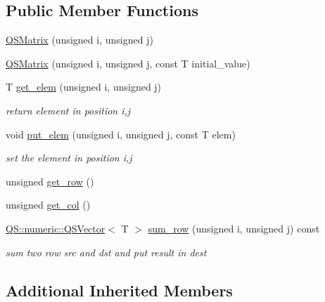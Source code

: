 \subsection*{Public Member Functions}
\begin{DoxyCompactItemize}
\item 
\hyperlink{classQS_1_1numeric_1_1QSMatrix_a5961bea3cd4910419a6b2974fd2273aa}{Q\-S\-Matrix} (unsigned i, unsigned j)
\item 
\hyperlink{classQS_1_1numeric_1_1QSMatrix_a59a9e72a3c77a464215ed2d0e1c4a1de}{Q\-S\-Matrix} (unsigned i, unsigned j, const T initial\-\_\-value)
\item 
T \hyperlink{classQS_1_1numeric_1_1QSMatrix_ad733adc478a7511c872a62ec05bf2af7}{get\-\_\-elem} (unsigned i, unsigned j)
\begin{DoxyCompactList}\small\item\em return element in position i,j \end{DoxyCompactList}\item 
void \hyperlink{classQS_1_1numeric_1_1QSMatrix_aee57227997548e02fc4ab7930c87cd89}{put\-\_\-elem} (unsigned i, unsigned j, const T elem)
\begin{DoxyCompactList}\small\item\em set the element in position i,j \end{DoxyCompactList}\item 
unsigned \hyperlink{classQS_1_1numeric_1_1QSMatrix_a3c89c928b221d02d8c359f1006263704}{get\-\_\-row} ()
\item 
unsigned \hyperlink{classQS_1_1numeric_1_1QSMatrix_aa524d0739fd9acb22a0c5dee5e85f190}{get\-\_\-col} ()
\item 
\hyperlink{classQS_1_1numeric_1_1QSVector}{Q\-S\-::numeric\-::\-Q\-S\-Vector}$<$ T $>$ \hyperlink{classQS_1_1numeric_1_1QSMatrix_abf7600e412c6113d936f54f3aae8f566}{sum\-\_\-row} (unsigned i, unsigned j) const 
\begin{DoxyCompactList}\small\item\em sum two row src and dst and put result in dest \end{DoxyCompactList}\end{DoxyCompactItemize}
\subsection*{Additional Inherited Members}


